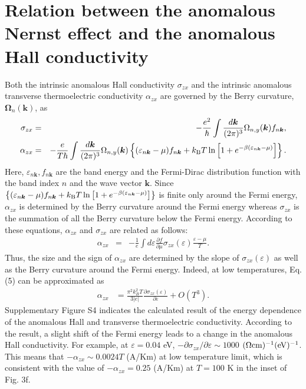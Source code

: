 \documentclass[amsmath,amssymb]{nature}
\begin{document}
\section{Relation between the anomalous Nernst effect and the anomalous Hall conductivity}
	Both the intrinsic anomalous Hall conductivity $\sigma_{zx}$ and the intrinsic anomalous transverse thermoelectric conductivity $\alpha_{zx}$  are governed by the Berry curvature, ${\bm \Omega}_n(\bm k)$, as\cite{Xiao2006}
\begin{eqnarray}
	\sigma_{zx} &=& -\frac{e^2}{\hbar} \int \frac{d \bm k}{(2 \pi)^3} \Omega_{n,y}(\bm k) f_{n \bm k},\\
	\alpha_{zx} &=& -\frac{e}{T \hbar} \int \frac{d \bm k}{(2 \pi)^3} \Omega_{n,y}(\bm k) 
	\left\{ (\varepsilon_{n \bm k} - \mu) f_{n \bm k} + k_{\rm B} T \ln \left[ 1 + e^{-\beta (\varepsilon_{n \bm k} - \mu)} \right] \right\}.
\end{eqnarray}
	Here, $\varepsilon_{n \bm k}, f_{n \bm k}$ are the band energy and the Fermi-Dirac distribution function with the band index $n$ and the wave vector $\bm k$. Since $\left\{ (\varepsilon_{n \bm k} - \mu) f_{n \bm k} + k_{\rm B} T \ln \left[ 1 + e^{-\beta (\varepsilon_{n \bm k} - \mu)} \right] \right\}$
	is finite only around the Fermi energy, $\alpha_{zx}$ is determined by the Berry curvature around the Fermi energy whereas $\sigma_{zx}$ is the summation of all the Berry curvature below the Fermi energy.
	According to these equations, $\alpha_{zx}$ and $\sigma_{zx}$ are related as follows:
\begin{eqnarray}
	\alpha_{zx} &=& -\frac{1}{e} \int d \varepsilon \frac{\partial f}{\partial \mu} \sigma_{zx}(\varepsilon) \frac{\varepsilon - \mu}{T}.
\end{eqnarray}
	Thus, the size and the sign of $\alpha_{zx}$ are determined by the slope of $\sigma_{zx}(\varepsilon)$ as well as the Berry curvature around the Fermi energy.
	Indeed, at low temperatures, Eq.(5) can be approximated as
\begin{eqnarray}
		\alpha_{zx} &= \frac{\pi^2 k_B^2 T}{3 |e|}\frac{\partial \sigma_{zx}(\varepsilon)}{\partial \varepsilon} + O(T^3).
\end{eqnarray}
	Supplementary Figure S4 indicates the calculated result of the energy dependence of the anomalous Hall and transverse thermoelectric conductivity.
	According to the result, a slight shift of the Fermi energy leads to a change in the anomalous Hall conductivity.
	For example, at $\varepsilon = 0.04$ eV, $-\partial \sigma_{zx}/\partial \varepsilon \sim 1000$ $(\Omega {\rm cm})^{-1} (\rm {eV})^{-1}$.
	This means that $-\alpha_{zx} \sim 0.0024 T$ (A/Km) at low temperature limit, which is consistent with the value of $-\alpha_{zx} = 0.25$ (A/Km) at $T=100$ K in the inset of Fig. 3f.
	
\end{document}
